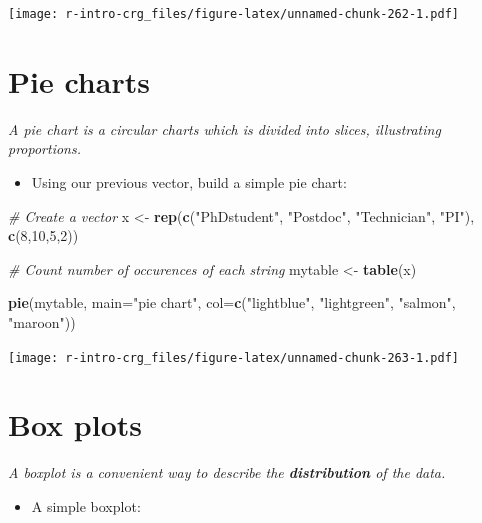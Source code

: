 \documentclass[]{book}
\newenvironment{Shaded}{\begin{snugshade}}{\end{snugshade}}
\newcommand{\CommentTok}[1]{\textcolor[rgb]{0.56,0.35,0.01}{\textit{#1}}}
\newcommand{\DataTypeTok}[1]{\textcolor[rgb]{0.13,0.29,0.53}{#1}}
\newcommand{\DecValTok}[1]{\textcolor[rgb]{0.00,0.00,0.81}{#1}}
\newcommand{\KeywordTok}[1]{\textcolor[rgb]{0.13,0.29,0.53}{\textbf{#1}}}
\newcommand{\NormalTok}[1]{#1}
\newcommand{\StringTok}[1]{\textcolor[rgb]{0.31,0.60,0.02}{#1}}
\providecommand{\tightlist}{%
  \setlength{\itemsep}{0pt}\setlength{\parskip}{0pt}}
\begin{document}
\texttt{[image: r-intro-crg\_files/figure-latex/unnamed-chunk-262-1.pdf]}

\hypertarget{pie-charts}{%
\section{Pie charts}\label{pie-charts}}

\emph{A pie chart is a circular charts which is divided into slices, illustrating proportions.}

\begin{itemize}
\tightlist
\item
  Using our previous vector, build a simple pie chart:
\end{itemize}

\begin{Shaded}
\begin{Highlighting}[]
\CommentTok{# Create a vector}
\NormalTok{x <-}\StringTok{ }\KeywordTok{rep}\NormalTok{(}\KeywordTok{c}\NormalTok{(}\StringTok{"PhDstudent"}\NormalTok{, }\StringTok{"Postdoc"}\NormalTok{, }\StringTok{"Technician"}\NormalTok{, }\StringTok{"PI"}\NormalTok{), }\KeywordTok{c}\NormalTok{(}\DecValTok{8}\NormalTok{,}\DecValTok{10}\NormalTok{,}\DecValTok{5}\NormalTok{,}\DecValTok{2}\NormalTok{))}

\CommentTok{# Count number of occurences of each string}
\NormalTok{mytable <-}\StringTok{ }\KeywordTok{table}\NormalTok{(x)}

\KeywordTok{pie}\NormalTok{(mytable,}
    \DataTypeTok{main=}\StringTok{"pie chart"}\NormalTok{,}
    \DataTypeTok{col=}\KeywordTok{c}\NormalTok{(}\StringTok{"lightblue"}\NormalTok{, }\StringTok{"lightgreen"}\NormalTok{, }\StringTok{"salmon"}\NormalTok{, }\StringTok{"maroon"}\NormalTok{))}
\end{Highlighting}
\end{Shaded}

\texttt{[image: r-intro-crg\_files/figure-latex/unnamed-chunk-263-1.pdf]}

\hypertarget{box-plots}{%
\section{Box plots}\label{box-plots}}

\emph{A boxplot is a convenient way to describe the \textbf{distribution} of the data.}

\begin{itemize}
\tightlist
\item
  A simple boxplot:
\end{itemize}
\end{document}

